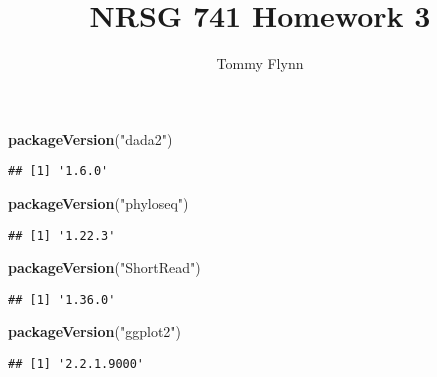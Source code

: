 \documentclass[]{elsarticle} %
\newenvironment{Shaded}{\begin{snugshade}}{\end{snugshade}}
\newcommand{\KeywordTok}[1]{\textcolor[rgb]{0.13,0.29,0.53}{\textbf{#1}}}
\newcommand{\StringTok}[1]{\textcolor[rgb]{0.31,0.60,0.02}{#1}}
\newcommand{\NormalTok}[1]{#1}
\begin{document}
\begin{frontmatter}

  \title{NRSG 741 Homework 3}
    \author[Emory University]{Tommy Flynn}
      \address[Github Website]{Repository available at
{[}https://github.com/tommyflynn/N741\_Homework{]}}
  
  \begin{abstract}
  
  \end{abstract}
  
 \end{frontmatter}

\begin{Shaded}
\begin{Highlighting}[]
\KeywordTok{packageVersion}\NormalTok{(}\StringTok{"dada2"}\NormalTok{)}
\end{Highlighting}
\end{Shaded}

\begin{verbatim}
## [1] '1.6.0'
\end{verbatim}

\begin{Shaded}
\begin{Highlighting}[]
\KeywordTok{packageVersion}\NormalTok{(}\StringTok{"phyloseq"}\NormalTok{)}
\end{Highlighting}
\end{Shaded}

\begin{verbatim}
## [1] '1.22.3'
\end{verbatim}

\begin{Shaded}
\begin{Highlighting}[]
\KeywordTok{packageVersion}\NormalTok{(}\StringTok{"ShortRead"}\NormalTok{)}
\end{Highlighting}
\end{Shaded}

\begin{verbatim}
## [1] '1.36.0'
\end{verbatim}

\begin{Shaded}
\begin{Highlighting}[]
\KeywordTok{packageVersion}\NormalTok{(}\StringTok{"ggplot2"}\NormalTok{)}
\end{Highlighting}
\end{Shaded}

\begin{verbatim}
## [1] '2.2.1.9000'
\end{verbatim}
\end{document}
